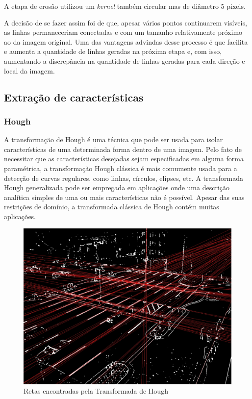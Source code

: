 \documentclass[10pt,twocolumn,letterpaper]{article}
\begin{document}
	A etapa de erosão utilizou um \emph{kernel} também circular mas de diâmetro 5 pixels.
	
	A decisão de se fazer assim foi de que, apesar vários pontos continuarem visíveis, as linhas
permaneceriam conectadas e com um tamanho relativamente próximo ao da imagem original. Uma
das vantagens advindas desse processo é que facilita e aumenta a quantidade de linhas geradas
na próxima etapa e, com isso, aumentando a discrepância na quantidade de linhas geradas para
cada direção e local da imagem.

\subsection{Extração de características}

\subsubsection{Hough}

	A transformação de Hough{\footnotesize \cite{hough}} é uma técnica que pode
ser usada para isolar características de uma determinada forma dentro de uma imagem.
Pelo fato de necessitar que as características desejadas sejam especificadas em alguma
forma paramétrica, a transformação Hough clássica é mais comumente usada para a
detecção de curvas regulares, como linhas, círculos, elipses, etc. A transformada Hough
generalizada pode ser empregada em aplicações onde uma descrição analítica simples
de uma ou mais características não é possível. Apesar das suas restrições de domínio,
a transformada clássica de Hough contém muitas aplicações.

\begin{figure}[!htb]
\centering
\includegraphics[width=\columnwidth]{hough-linhas.jpg}
\caption{Retas encontradas pela Transformada de Hough}
\label{fig:hough}
\end{figure}
\end{document}
